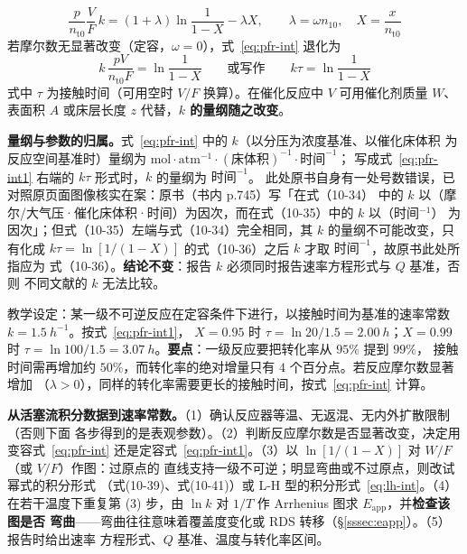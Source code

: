 \begin{equation}
\frac{p}{n_{\mathrm t0}}\frac{V}{F}\,k
=(1+\lambda)\ln\frac{1}{1-X}-\lambda X,
\qquad \lambda=\omega n_{10},\quad X=\frac{x}{n_{\mathrm t0}}
\label{eq:pfr-int}
\end{equation}
若摩尔数无显著改变（定容，$\omega=0$），式~\eqref{eq:pfr-int} 退化为
\begin{equation}
k\,\frac{pV}{n_{\mathrm t0}F}=\ln\frac{1}{1-X}
\qquad\text{或写作}\qquad
k\tau=\ln\frac{1}{1-X}
\label{eq:pfr-int1}
\end{equation}
式中 $\tau$ 为接触时间（可用空时 $V/F$ 换算）。在催化反应中 $V$ 可用催化剂质量 $W$、
表面积 $A$ 或床层长度 $z$ 代替，\textbf{$k$ 的量纲随之改变}。

\begin{principle}
\textbf{量纲与参数的归属。}式~\eqref{eq:pfr-int} 中的 $k$（以分压为浓度基准、以催化床体积
为反应空间基准时）量纲为 $\mathrm{mol{\cdot}atm^{-1}{\cdot}(床体积)^{-1}{\cdot}时间^{-1}}$；
写成式~\eqref{eq:pfr-int1} 右端的 $k\tau$ 形式时，$k$ 的量纲为 $\mathrm{时间^{-1}}$。
此处原书自身有一处号数错误，已对照原页面图像核实在案：原书（书内 p.745）写「在式（10-34）
中的 $k$ 以（摩尔/大气压·催化床体积·时间）为因次，而在式（10-35）中的 $k$ 以（时间$^{-1}$）
为因次」；但式（10-35）左端与式（10-34）完全相同，其 $k$ 的量纲不可能改变，只有化成
$k\tau=\ln[1/(1-X)]$ 的式（10-36）之后 $k$ 才取 $\mathrm{时间^{-1}}$，故原书此处所指应为
式（10-36）。\textbf{结论不变}：报告 $k$ 必须同时报告速率方程形式与 $Q$ 基准，否则
不同文献的 $k$ 无法比较。
\end{principle}

\begin{example}[由积分式求接触时间]
教学设定：某一级不可逆反应在定容条件下进行，以接触时间为基准的速率常数
$k=\qty{1.5}{h^{-1}}$。按式~\eqref{eq:pfr-int1}，
$X=0.95$ 时 $\tau=\ln 20/1.5=\qty{2.00}{h}$；$X=0.99$ 时
$\tau=\ln 100/1.5=\qty{3.07}{h}$。\textbf{要点}：一级反应要把转化率从 $95\%$ 提到 $99\%$，
接触时间需再增加约 $50\%$，而转化率的绝对增量只有 $4$ 个百分点。若反应摩尔数显著增加
（$\lambda>0$），同样的转化率需要更长的接触时间，按式~\eqref{eq:pfr-int} 计算。
\end{example}

\begin{dataflow}
\textbf{从活塞流积分数据到速率常数。}（1）确认反应器等温、无返混、无内外扩散限制（否则下面
各步得到的是表观参数）。（2）判断反应摩尔数是否显著改变，决定用变容式~\eqref{eq:pfr-int}
还是定容式~\eqref{eq:pfr-int1}。（3）以 $\ln[1/(1-X)]$ 对 $W/F$（或 $V/F$）作图：过原点的
直线支持一级不可逆；明显弯曲或不过原点，则改试幂式的积分形式
（式(10-39)、式(10-41)）或 L-H 型的积分形式~\eqref{eq:lh-int}。（4）在若干温度下重复第
(3) 步，由 $\ln k$ 对 $1/T$ 作 Arrhenius 图求 $E_{\mathrm{app}}$，并\textbf{检查该图是否
弯曲}——弯曲往往意味着覆盖度变化或 RDS 转移（§\ref{sssec:eapp}）。（5）报告时给出速率
方程形式、$Q$ 基准、温度与转化率区间。
\end{dataflow}


